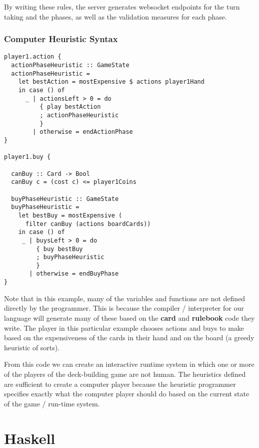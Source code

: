 \documentclass{acm_proc_article-sp}
\begin{document}
By writing these rules, the server generates websocket endpoints for the turn
taking and the phases, as well as the validation measures for each phase.

\subsubsection{Computer Heuristic Syntax}
\begin{verbatim}
player1.action {
  actionPhaseHeuristic :: GameState
  actionPhaseHeuristic =
    let bestAction = mostExpensive $ actions player1Hand
    in case () of
      _ | actionsLeft > 0 = do
          { play bestAction
          ; actionPhaseHeuristic
          }
        | otherwise = endActionPhase
}

player1.buy {

  canBuy :: Card -> Bool
  canBuy c = (cost c) <= player1Coins

  buyPhaseHeuristic :: GameState
  buyPhaseHeuristic =
    let bestBuy = mostExpensive (
      filter canBuy (actions boardCards))
    in case () of
     _ | buysLeft > 0 = do
         { buy bestBuy
         ; buyPhaseHeuristic
         }
       | otherwise = endBuyPhase
}
\end{verbatim}

Note that in this example, many of the variables and functions are not defined directly
by the programmer. This is because the compiler / interpreter for our language will generate
many of these based on the {\bf card} and {\bf rulebook} code they write. The player in this
particular example chooses actions and buys to make based on the expensiveness of the cards
in their hand and on the board (a greedy heuristic of sorts).

From this code we can create an interactive runtime system in which one or more of the players
of the deck-building game are not human. The heuristics defined are sufficient to create a
computer player because the heuristic programmer specifies exactly what the computer player
should do based on the current state of the game / run-time system.

\section{Haskell}
\label{sec:haskell}
\end{document}
